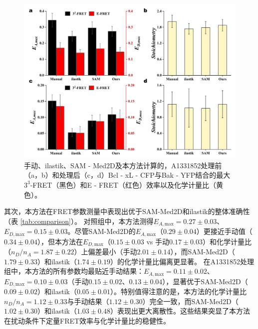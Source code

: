 \begin{figure}[!htb]
  \centering
  \includegraphics[width=1\linewidth]{../figures/4/4_方法对比.png}
  \caption{手动、ilastik、SAM - Med2D及本方法计算的，A1331852处理前（a，b）和处理后（c，d）Bcl - xL - CFP与Bak - YFP结合的最大$3^3$-FRET（黑色）和E - FRET（红色）效率以及化学计量比（黄色）。}\label{fig3}
\end{figure}

其次，本方法在FRET参数测量中表现出优于SAM-Med2D和ilastik的整体准确性（表 \ref{tab:comparison}）。
对照组中，本方法测得$E_{A,\text{max}}=0.27\pm0.03$、$E_{D,\text{max}}=0.15\pm0.03$。尽管SAM-Med2D的$E_{A,\text{max}}$（$0.29\pm0.04$）更接近手动值（$0.34\pm0.04$），但本方法在$E_{D,\text{max}}$（$0.15\pm0.03$ vs 手动$0.17\pm0.03$）和化学计量比（$n_D/n_A=1.87\pm0.22$）上偏差最小（手动$2.01\pm0.14$），而SAM-Med2D（$1.79\pm0.33$）和ilastik（$1.74\pm0.19$）的化学计量比偏离更显著。
在A1331852处理组中，本方法的所有参数均最贴近手动结果：$E_{A,\text{max}}=0.11\pm0.02$、$E_{D,\text{max}}=0.10\pm0.03$（手动$0.15\pm0.02$、$0.13\pm0.04$），显著优于SAM-Med2D（$0.09\pm0.02$）和ilastik（$0.05\pm0.01$）。特别值得注意的是，本方法的化学计量比$n_D/n_A=1.12\pm0.33$与手动结果（$1.12\pm0.30$）完全一致，而SAM-Med2D（$1.02\pm0.30$）和ilastik（$1.03\pm0.48$）表现出更大离散性。这些结果突显了本方法在扰动条件下定量FRET效率与化学计量比的稳健性。

